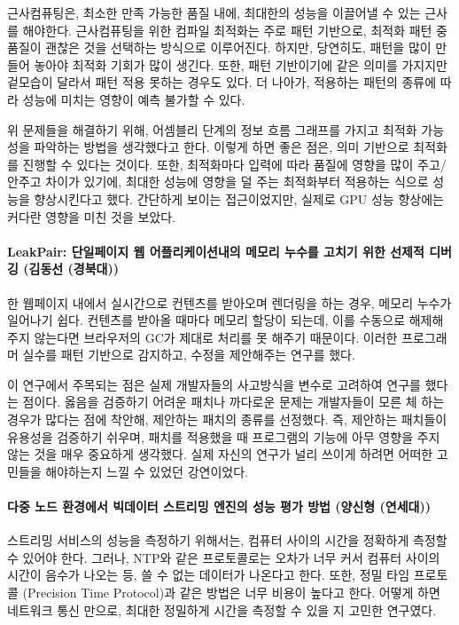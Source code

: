\documentclass{article}
\begin{document}
근사컴퓨팅은, 최소한 만족 가능한 품질 내에, 최대한의 성능을 이끌어낼 수 있는 근사를 해야한다.
근사컴퓨팅을 위한 컴파일 최적화는 주로 패턴 기반으로, 최적화 패턴 중 품질이 괜찮은 것을 선택하는 방식으로 이루어진다.
하지만, 당연히도, 패턴을 많이 만들어 놓아야 최적화 기회가 많이 생긴다.
또한, 패턴 기반이기에 같은 의미를 가지지만 겉모습이 달라서 패턴 적용 못하는 경우도 있다.
더 나아가, 적용하는 패턴의 종류에 따라 성능에 미치는 영향이 예측 불가할 수 있다.

위 문제들을 해결하기 위해, 어셈블리 단계의 정보 흐름 그래프를 가지고 최적화 가능성을 파악하는 방법을 생각했다고 한다.
이렇게 하면 좋은 점은, 의미 기반으로 최적화를 진행할 수 있다는 것이다.
또한, 최적화마다 입력에 따라 품질에 영향을 많이 주고/안주고 차이가 있기에, 최대한 성능에 영향을 덜 주는 최적화부터 적용하는 식으로 성능을 향상시킨다고 했다.
간단하게 보이는 접근이었지만, 실제로 GPU 성능 향상에는 커다란 영향을 미친 것을 보았다.
\paragraph{LeakPair: 단일페이지 웹 어플리케이션내의 메모리 누수를 고치기 위한 선제적 디버깅 (김동선 (경북대))}
한 웹페이지 내에서 실시간으로 컨텐츠를 받아오며 렌더링을 하는 경우, 메모리 누수가 일어나기 쉽다.
컨텐츠를 받아올 때마다 메모리 할당이 되는데, 이를 수동으로 해제해주지 않는다면 브라우저의 GC가 제대로 처리를 못 해주기 때문이다.
이러한 프로그래머 실수를 패턴 기반으로 감지하고, 수정을 제안해주는 연구를 했다.

이 연구에서 주목되는 점은 실제 개발자들의 사고방식을 변수로 고려하여 연구를 했다는 점이다.
옳음을 검증하기 어려운 패치나 까다로운 문제는 개발자들이 모른 체 하는 경우가 많다는 점에 착안해, 제안하는 패치의 종류를 선정했다.
즉, 제안하는 패치들이 유용성을 검증하기 쉬우며, 패치를 적용했을 때 프로그램의 기능에 아무 영향을 주지 않는 것을 매우 중요하게 생각했다.
실제 자신의 연구가 널리 쓰이게 하려면 어떠한 고민들을 해야하는지 느낄 수 있었던 강연이었다.
\paragraph{다중 노드 환경에서 빅데이터 스트리밍 엔진의 성능 평가 방법 (양신형 (연세대))}
스트리밍 서비스의 성능을 측정하기 위해서는, 컴퓨터 사이의 시간을 정확하게 측정할 수 있어야 한다.
그러나, NTP와 같은 프로토콜로는 오차가 너무 커서 컴퓨터 사이의 시간이 음수가 나오는 등, 쓸 수 없는 데이터가 나온다고 한다.
또한, 정밀 타임 프로토콜 (Precision Time Protocol)과 같은 방법은 너무 비용이 높다고 한다.
어떻게 하면 네트워크 통신 만으로, 최대한 정밀하게 시간을 측정할 수 있을 지 고민한 연구였다.
\end{document}
